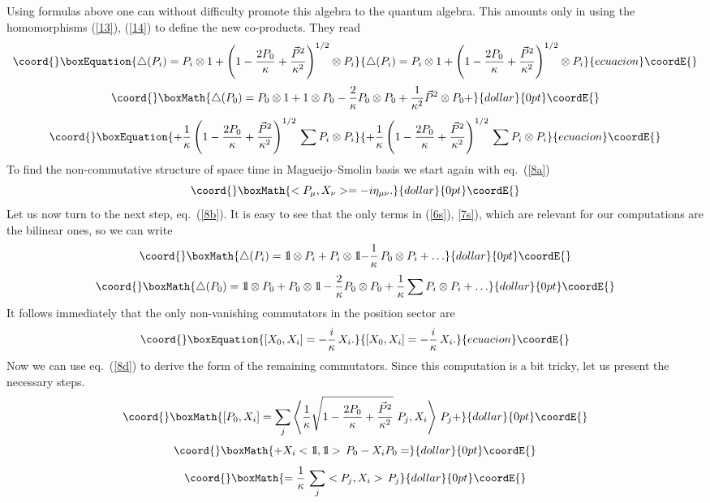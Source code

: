 \documentclass [prd,twocolumn,nofootinbib,showpacs]  {revtex4}
\def\bbbone{{\mathchoice {\rm 1\mskip-4mu l} {\rm 1\mskip-4mu l}
{\rm 1\mskip-4.5mu l} {\rm 1\mskip-5mu l}}}
\begin{document}
 Using  formulas above one can without difficulty promote this algebra to the quantum algebra. This
 amounts only in using the homomorphisms (\ref{13}), (\ref{14}) to define the new co-products. They read
\begin{equation}\coord{}\boxEquation{\label{6s}
  \triangle(P_{i})=P_{i} \otimes 1 + \left(1 - \frac{2P_{0}}{\kappa} +
   \frac{\vec{P}^{2}}{\kappa^{2}}\right)^{{1}/{2}} \otimes P_{i}
}{\triangle(P_{i})=P_{i} \otimes 1 + \left(1 - \frac{2P_{0}}{\kappa} +
   \frac{\vec{P}^{2}}{\kappa^{2}}\right)^{{1}/{2}} \otimes P_{i}
}{ecuacion}\coordE{}\end{equation}
$$\coord{}\boxMath{
  \triangle(P_{0})=P_{0} \otimes 1 + 1 \otimes P_{0} -
  \frac{2}{\kappa}P_{0} \otimes P_{0} + \frac{1}{\kappa^{2}}
   \vec{P}^{2}\otimes P_{0} +
}{dollar}{0pt}\coordE{}$$
\begin{equation}\coord{}\boxEquation{\label{7s}
   + \frac{1}{\kappa} \left(1 - \frac{2P_{0}}{\kappa} +
   \frac{\vec{P}^{2}}{\kappa^{2}}\right)^{{1}/{2}} \, \sum P_{i}\otimes P_{i}
}{+ \frac{1}{\kappa} \left(1 - \frac{2P_{0}}{\kappa} +
   \frac{\vec{P}^{2}}{\kappa^{2}}\right)^{{1}/{2}} \, \sum P_{i}\otimes P_{i}
}{ecuacion}\coordE{}\end{equation}
To find the non-commutative structure of space time in Magueijo--Smolin basis we start again with eq.~(\ref{8a})
$$\coord{}\boxMath{
 <P_\mu, X_\nu> =  -i \eta_{\mu\nu}.
}{dollar}{0pt}\coordE{}$$
Let us now turn to the next step, eq.~(\ref{8b}). It is easy to
see that the only terms in (\ref{6s}), \ref{7s}),  which are
relevant for our computations are the bilinear ones, so we can
write
$$\coord{}\boxMath{
  \triangle(P_{i})=\bbbone \otimes P_{i} + P_{i} \otimes \bbbone {-\frac{1}{\kappa}}\, P_{0} \otimes P_{i} + \ldots
}{dollar}{0pt}\coordE{}$$  $$\coord{}\boxMath{
  \triangle(P_{0})= \bbbone \otimes P_{0} + P_{0} \otimes \bbbone -
  \frac{2}{\kappa}P_{0} \otimes P_{0} +  \frac{1}{\kappa}\sum P_{i}\otimes P_{i}+ \ldots
}{dollar}{0pt}\coordE{}$$
It follows immediately that the only non-vanishing commutators in the position sector are
\begin{equation}\coord{}\boxEquation{\label{15}
  [X_0, X_i] = -\frac{i}\kappa\, X_i.
}{[X_0, X_i] = -\frac{i}\kappa\, X_i.
}{ecuacion}\coordE{}\end{equation}
Now we can use eq.~(\ref{8d}) to derive the form of the remaining
commutators. Since this computation is a bit tricky, let us
present the necessary steps.
$$\coord{}\boxMath{
[P_0, X_i] = \sum_j \left<\frac{1}{\kappa} \sqrt{1 -
\frac{2P_{0}}{\kappa} +
   \frac{\vec{P}^{2}}{\kappa^{2}}} \,\,  P_{j}, X_i\right>\, P_j  + }{dollar}{0pt}\coordE{}$$  $$\coord{}\boxMath{ +
X_i <\bbbone, \bbbone>\, P_0 - X_i P_0 =
}{dollar}{0pt}\coordE{}$$  $$\coord{}\boxMath{
=\frac{1}{\kappa}\,\sum_j <P_{j}, X_i>\, P_j
}{dollar}{0pt}\coordE{}$$
\end{document}
